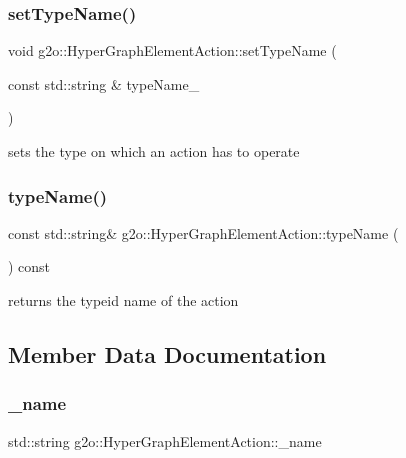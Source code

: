 \subsubsection{\texorpdfstring{set\+Type\+Name()}{setTypeName()}}
{\footnotesize\ttfamily void g2o\+::\+Hyper\+Graph\+Element\+Action\+::set\+Type\+Name (\begin{DoxyParamCaption}\item[{const std\+::string \&}]{type\+Name\+\_\+ }\end{DoxyParamCaption})}



sets the type on which an action has to operate 

\mbox{\label{classg2o_1_1_hyper_graph_element_action_ae8c48d4b811320516bd5b0ef663190e3}} 
\subsubsection{\texorpdfstring{type\+Name()}{typeName()}}
{\footnotesize\ttfamily const std\+::string\& g2o\+::\+Hyper\+Graph\+Element\+Action\+::type\+Name (\begin{DoxyParamCaption}{ }\end{DoxyParamCaption}) const\hspace{0.3cm}{\ttfamily [inline]}}



returns the typeid name of the action 



\subsection{Member Data Documentation}
\mbox{\label{classg2o_1_1_hyper_graph_element_action_a31245b0a79dfb357e3b345ff57b7b491}} 
\subsubsection{\texorpdfstring{\+\_\+name}{\_name}}
{\footnotesize\ttfamily std\+::string g2o\+::\+Hyper\+Graph\+Element\+Action\+::\+\_\+name\hspace{0.3cm}{\ttfamily [protected]}}


